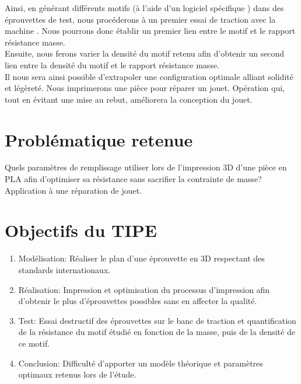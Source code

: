\documentclass[12pt, french]{article}
\begin{document}
Ainsi, en générant différents motifs (à l'aide d'un logiciel spécifique \cite{prusa}) dans des éprouvettes de test, nous procéderons à un premier essai de traction avec la machine \cite{instron}. Nous pourrons donc établir un premier lien entre le motif et le rapport résistance masse.\\
Ensuite, nous ferons varier la densité du motif retenu afin d'obtenir un second lien entre la densité du motif et le rapport résistance masse. \cite{infill}\\

	 Il nous sera ainsi possible d'extrapoler une configuration optimale alliant solidité et légèreté. Nous imprimerons une pièce pour réparer un jouet. Opération qui, tout en évitant une mise au rebut, améliorera la conception du jouet.
\section*{Problématique retenue}
 Quels paramètres de remplissage utiliser lors de l'impression 3D d'une pièce en PLA afin d'optimiser sa résistance sans sacrifier la contrainte de masse? Application à une réparation de jouet.
\section*{Objectifs du TIPE}
\begin{enumerate}
	\item	Modélisation: Réaliser le plan d'une éprouvette en 3D respectant des standards internationaux.
    \item	Réalisation: Impression et optimisation du processus d’impression afin d’obtenir le plus d’éprouvettes possibles sans en affecter la qualité.
    \item	Test: Essai destructif des éprouvettes sur le banc de traction et quantification de la résistance du motif étudié en fonction de la masse, puis de la densité de ce motif.
    \item	Conclusion: Difficulté d'apporter un modèle théorique et paramètres optimaux retenus lors de l'étude.
\end{enumerate}




\cite{sports}
\cite{toys}
\cite{moula}
\cite{infill}
\cite{tensiletestd638}
\cite{ASTMD638}
\cite{rdm}
\cite{prusa}
\cite{instron}
\end{document}

